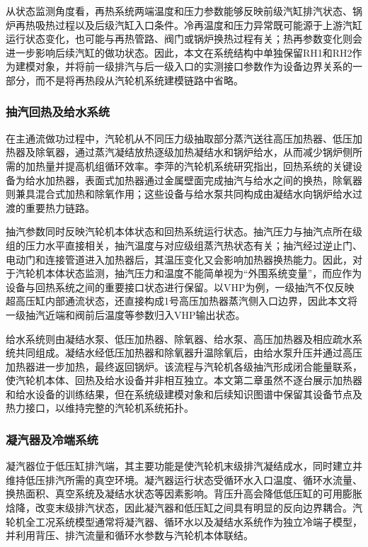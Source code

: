 从状态监测角度看，再热系统两端温度和压力参数能够反映前级汽缸排汽状态、锅炉再热吸热过程以及后级汽缸入口条件。冷再温度和压力异常既可能源于上游汽缸运行状态变化，也可能与再热管路、阀门或锅炉换热过程有关；热再参数变化则会进一步影响后续汽缸的做功状态。因此，本文在系统结构中单独保留RH1和RH2作为建模对象，并将前一级排汽与后一级入口的实测接口参数作为设备边界关系的一部分，而不是将再热段从汽轮机系统建模链路中省略。

\subsubsection{抽汽回热及给水系统}

在主通流做功过程中，汽轮机从不同压力级抽取部分蒸汽送往高压加热器、低压加热器及除氧器，通过蒸汽凝结放热逐级加热凝结水和锅炉给水，从而减少锅炉侧所需的加热量并提高机组循环效率。李萍的汽轮机系统研究指出，回热系统的关键设备为给水加热器，表面式加热器通过金属壁面完成抽汽与给水之间的换热，除氧器则兼具混合式加热和除氧作用；这些设备与给水泵共同构成由凝结水向锅炉给水过渡的重要热力链路\cite{LiPing2018SteamTurbine}。

抽汽参数同时反映汽轮机本体状态和回热系统运行状态。抽汽压力与抽汽点所在级组的压力水平直接相关，抽汽温度与对应级组蒸汽热状态有关；抽汽经过逆止门、电动门和连接管道进入加热器后，其温压变化又会影响加热器换热能力。因此，对于汽轮机本体状态监测，抽汽压力和温度不能简单视为“外围系统变量”，而应作为设备与回热系统之间的重要接口状态进行保留。以VHP为例，一级抽汽不仅反映超高压缸内部通流状态，还直接构成1号高压加热器蒸汽侧入口边界，因此本文将一级抽汽近端和阀前后温度等参数归入VHP输出状态。

给水系统则由凝结水泵、低压加热器、除氧器、给水泵、高压加热器及相应疏水系统共同组成。凝结水经低压加热器和除氧器升温除氧后，由给水泵升压并通过高压加热器进一步加热，最终返回锅炉。该流程与汽轮机各级抽汽形成闭合能量联系，使汽轮机本体、回热及给水设备并非相互独立。本文第二章虽然不逐台展示加热器和给水设备的训练结果，但在系统级建模对象和后续知识图谱中保留其设备节点及热力接口，以维持完整的汽轮机系统拓扑。

\subsubsection{凝汽器及冷端系统}

凝汽器位于低压缸排汽端，其主要功能是使汽轮机末级排汽凝结成水，同时建立并维持低压排汽所需的真空环境。凝汽器运行状态受循环水入口温度、循环水流量、换热面积、真空系统及凝结水状态等因素影响。背压升高会降低低压缸的可用膨胀焓降，改变末级排汽状态，因此凝汽器和低压缸之间具有明显的反向边界耦合。汽轮机全工况系统模型通常将凝汽器、循环水以及凝结水系统作为独立冷端子模型，并利用背压、排汽流量和循环水参数与汽轮机本体联结\cite{Zhang2018AllCondition}。

